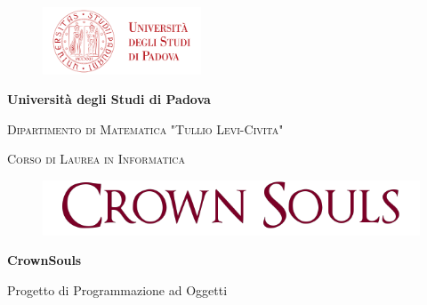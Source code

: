 \begin{titlepage}

\begin{figure}[htbp]
\flushright
\includegraphics[height=2cm]{img/log_uni}
\end{figure}

\begin{center}
\begin{vplace}
\begin{LARGE}
\textbf{Università degli Studi di Padova} \\
\end{LARGE}


\vspace{8pt}

\begin{Large}
\textsc{Dipartimento di Matematica "Tullio Levi-Civita"} \\
\end{Large}

\vspace{8pt}

\begin{large}
\textsc{Corso di Laurea in Informatica}\\
\end{large}

\vspace{110pt}
\begin{figure}[htbp]
\begin{center}
\includegraphics[width=\textwidth]{img/logo}
\end{center}
\end{figure}
\vspace{80pt}


\begin{center}
  \begin{huge}
\textbf{CrownSouls} \\
\end{huge}
\vspace{20pt}
\begin{LARGE}
Progetto di Programmazione ad Oggetti
\end{LARGE}
\end{center}



\end{vplace}
\end{center}
\end{titlepage}
